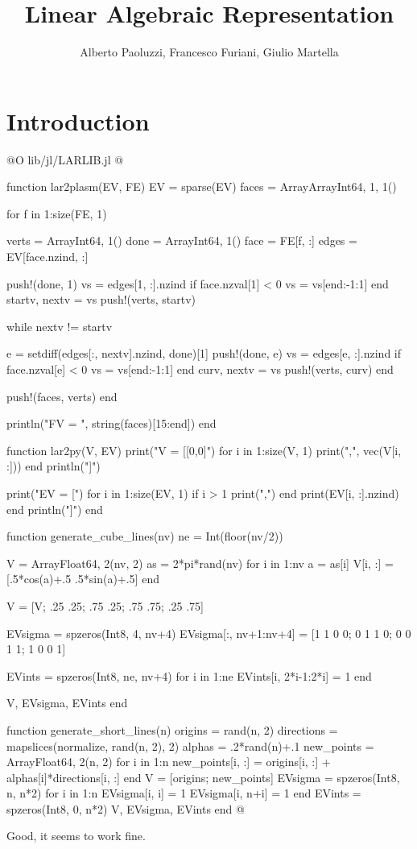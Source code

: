 \documentclass[10pt]{book}
\author{Alberto Paoluzzi, Francesco Furiani, Giulio Martella}
\title{Linear Algebraic Representation}
\begin{document}
\frontmatter
\maketitle
\tableofcontents

\mainmatter

\chapter{Introduction}

@O lib/jl/LARLIB.jl
@{function lar2plasm(EV, FE)
    EV = sparse(EV)
    faces = Array{Array{Int64, 1}, 1}()

    for f in 1:size(FE, 1)

        verts = Array{Int64, 1}()
        done = Array{Int64, 1}()
        face = FE[f, :]
        edges = EV[face.nzind, :]

        push!(done, 1)
        vs = edges[1, :].nzind
        if face.nzval[1] < 0
            vs = vs[end:-1:1]
        end
        startv, nextv = vs
        push!(verts, startv)

        while nextv != startv
            
            e = setdiff(edges[:, nextv].nzind, done)[1]
            push!(done, e)
            vs = edges[e, :].nzind
            if face.nzval[e] < 0
                vs = vs[end:-1:1]
            end
            curv, nextv = vs
            push!(verts, curv)
        end

        push!(faces, verts)
    end

    println("FV = ", string(faces)[15:end])
end

function lar2py(V, EV)
    print("V = [[0,0]")
    for i in 1:size(V, 1)
        print(",", vec(V[i, :]))
    end
    println("]")
    
    print("EV = [")
    for i in 1:size(EV, 1)
        if i > 1 print(",") end
        print(EV[i, :].nzind)
    end
    println("]")
end

function generate_cube_lines(nv)
    ne = Int(floor(nv/2))
    
    V = Array{Float64, 2}(nv, 2)
    as = 2*pi*rand(nv)
    for i in 1:nv
        a = as[i]
        V[i, :] = [.5*cos(a)+.5 .5*sin(a)+.5]
    end
    
    V = [V; .25 .25; .75 .25; .75 .75; .25 .75]
    

    EVsigma = spzeros(Int8, 4, nv+4)
    EVsigma[:, nv+1:nv+4] = [1 1 0 0; 0 1 1 0; 0 0 1 1; 1 0 0 1]

    EVints = spzeros(Int8, ne, nv+4)
    for i in 1:ne
        EVints[i, 2*i-1:2*i] = 1
    end
    
    V, EVsigma, EVints
end


function generate_short_lines(n)
    origins = rand(n, 2)
    directions = mapslices(normalize, rand(n, 2), 2)
    alphas = .2*rand(n)+.1
    new_points = Array{Float64, 2}(n, 2)
    for i in 1:n
        new_points[i, :] = origins[i, :] + alphas[i]*directions[i, :]
    end
    V = [origins; new_points]
    EVsigma = spzeros(Int8, n, n*2)
    for i in 1:n
        EVsigma[i, i] = 1
        EVsigma[i, n+i] = 1
    end
    EVints = spzeros(Int8, 0, n*2)
    V, EVsigma, EVints
end
@}


Good, it seems to work fine.


\backmatter


{}

\end{document}
